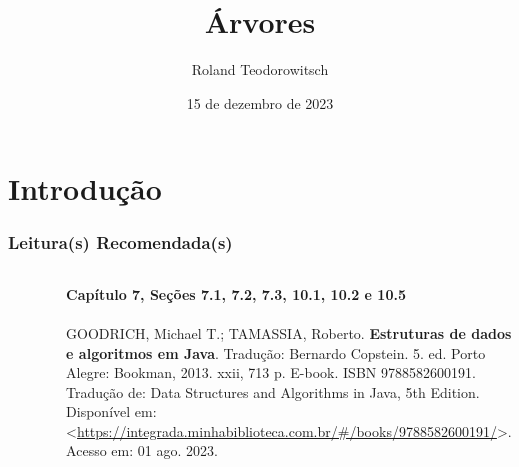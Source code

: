 \documentclass[aspectratio=169]{beamer}
\title[\sc{Árvores}]{Árvores}
\author[Roland Teodorowitsch]{Roland Teodorowitsch}
\institute[ALEST I - EP - PUCRS]{Algoritmos e Estruturas de Dados I - Escola Politécnica - PUCRS}
\date{15 de dezembro de 2023}
\begin{document}
\justifying

\begin{frame}
	\titlepage
\end{frame}

\section{Introdução}

\begin{frame}\frametitle{Leitura(s) Recomendada(s)}

\begin{columns}[T]
\begin{column}{0.15\linewidth}
\vspace{-3mm}
\begin{figure}[h]
	\centering
	\includegraphics[height=0.3\paperheight]{imagens/livro_goodrich.jpg}
\end{figure}
\end{column}
\begin{column}{0.85\linewidth}
\tiny{\textbf{Capítulo 7, Seções 7.1, 7.2, 7.3, 10.1, 10.2 e 10.5}\\
~}\\
\scriptsize{GOODRICH, Michael T.; TAMASSIA, Roberto. \textbf{Estruturas de dados e algoritmos em Java}. Tradução: Bernardo Copstein. 5. ed. Porto Alegre: Bookman, 2013. xxii, 713 p. E-book. ISBN 9788582600191. Tradução de: Data Structures and Algorithms in Java, 5th Edition. Disponível em: \textless{}\url{https://integrada.minhabiblioteca.com.br/\#/books/9788582600191/}\textgreater{}. Acesso em: 01 ago. 2023.}
\end{column}
\end{columns}

\end{frame}

\end{document}
